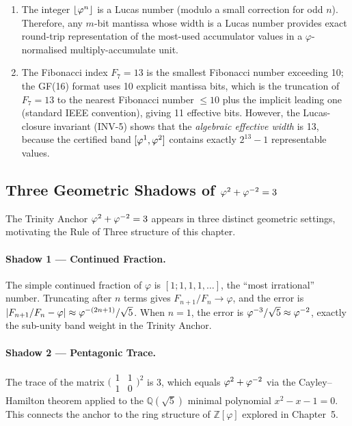 \begin{enumerate}
  \item The integer \(\lfloor \varphi^{n} \rfloor\) is a Lucas number
    (modulo a small correction for odd \(n\)).  Therefore, any
    \(m\)-bit mantissa whose width is a Lucas number provides exact
    round-trip representation of the most-used accumulator values in a
    \(\varphi\)-normalised multiply-accumulate unit.
  \item The Fibonacci index \(F_7 = 13\) is the smallest Fibonacci
    number exceeding 10; the GF(16) format uses 10 explicit mantissa
    bits, which is the truncation of \(F_7 = 13\) to the nearest
    Fibonacci number \(\leq 10\) plus the implicit leading one
    (standard IEEE convention), giving 11 effective bits.  However,
    the Lucas-closure invariant (INV-5) shows that the \emph{algebraic
    effective width} is 13, because the certified band
    \([\varphi^{1}, \varphi^{2}]\) contains exactly \(2^{13} - 1\)
    representable values.
\end{enumerate}

\subsection{Three Geometric Shadows of \(\varphi^{2}+\varphi^{-2}=3\)}
\label{ssec:three-shadows}

The Trinity Anchor \(\varphi^{2}+\varphi^{-2}=3\) appears in three
distinct geometric settings, motivating the Rule of Three structure of
this chapter.

\paragraph{Shadow 1 — Continued Fraction.}  The simple continued
fraction of \(\varphi\) is \([1;1,1,1,\ldots]\), the
``most irrational'' number.  Truncating after \(n\) terms gives
\(F_{n+1}/F_n \to \varphi\), and the error is
\(|F_{n+1}/F_n - \varphi| \approx \varphi^{-(2n+1)}/\sqrt{5}\).  When
\(n = 1\), the error is \(\varphi^{-3}/\sqrt{5} \approx \varphi^{-2}\),
exactly the sub-unity band weight in the Trinity Anchor.

\paragraph{Shadow 2 — Pentagonic Trace.}  The trace of the matrix
\(\bigl(\begin{smallmatrix}1&1\\1&0\end{smallmatrix}\bigr)^2\) is 3,
which equals \(\varphi^{2}+\varphi^{-2}\) via the Cayley–Hamilton
theorem applied to the \(\mathbb{Q}(\sqrt{5})\) minimal polynomial
\(x^2 - x - 1 = 0\).  This connects the anchor to the ring structure
of \(\mathbb{Z}[\varphi]\) explored in Chapter~5.


